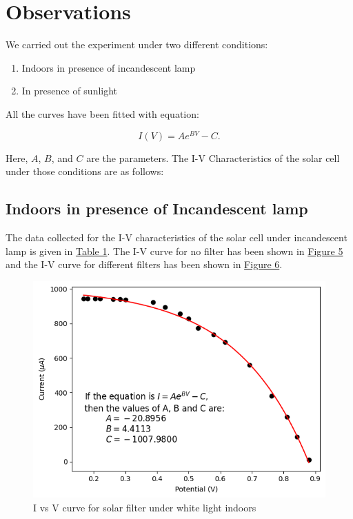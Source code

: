 \section{Observations}
	We carried out the experiment under two different conditions: 
	
	\begin{enumerate}
		\item Indoors in presence of incandescent lamp
		\item In presence of sunlight
	\end{enumerate}
	All the curves have been fitted with equation:
	
	\begin{equation}
		I(V) = Ae^{BV} - C.
		\label{eq:2}
	\end{equation}
	
	Here, $A$, $B$, and $C$ are the parameters. The I-V Characteristics of the solar cell under those conditions are as follows:
	\subsection{Indoors in presence of Incandescent lamp}
		

		The data collected for the I-V characteristics of the solar cell under incandescent lamp is given in \hyperref[tab:indoor]{Table 1}. The I-V curve for no filter has been shown in \hyperref[graph:1]{Figure 5} and the I-V curve for different filters has been shown in \hyperref[graph:2]{Figure 6}.

		\begin{figure}[H]
			\centering
			\includegraphics[width=0.75\columnwidth]{images/graph_1.png}
			\caption{I vs V curve for solar filter under white light indoors}
			\label{graph:1}
		\end{figure}

